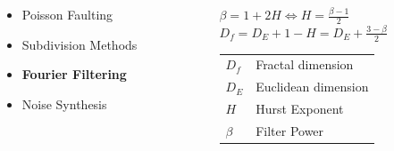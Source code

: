 \documentclass[aspectratio=169]{beamer}
\newenvironment{myframe}[1][t]{\begin{frame}[#1]{\secname}{\subsecname}}{\end{frame}}
\begin{document}
	\begin{myframe}
		\begin{columns}[T]
			\begin{column}{0.45\linewidth}
				\begin{itemize}
					\item Poisson Faulting
					\item Subdivision Methods
					\item \textbf{Fourier Filtering}
					\item Noise Synthesis
				\end{itemize}
			\end{column}
			
			\begin{column}{0.5\linewidth}
				$\beta = 1 + 2 H \Leftrightarrow H = \frac{\beta - 1}{2}$ \\[1em]
				$D_f = D_E + 1 - H = D_E + \frac{3-\beta}{2}$ \\[1.5em]
				\scriptsize{
					\hspace{-1em}
					\begin{tabular}{p{0.5em}l}
						$D_f$ & Fractal dimension \\
						$D_E$ & Euclidean dimension \\
						$H$ & Hurst Exponent \\
						$\beta$ & Filter Power
					\end{tabular}
				}
			\end{column}
		\end{columns}
	\end{myframe}
	
\end{document}
